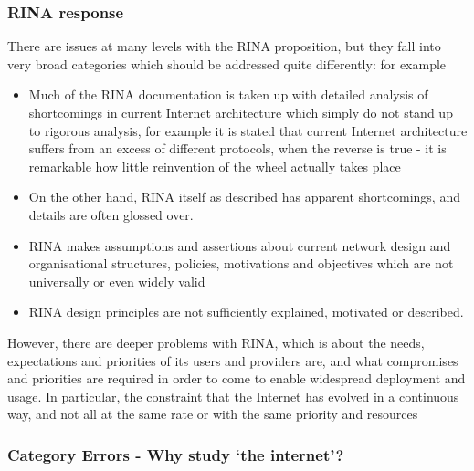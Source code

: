 \subsubsection{RINA response}

There are issues at many levels with the RINA proposition, but they fall into very broad categories which should be addressed quite differently: for example

\begin{itemize}
	\item Much of the RINA documentation is taken up with detailed analysis of shortcomings in current Internet architecture which simply do not stand up to rigorous analysis, for example it is stated that current Internet architecture suffers from an excess of different protocols, when the reverse is true - it is remarkable how little reinvention of the wheel actually takes place
	\item On the other hand, RINA itself as described has apparent shortcomings, and details are often glossed over.
	\item RINA makes assumptions and assertions about
	      current network design and organisational structures, policies, motivations and objectives which are not universally or even widely valid
	\item RINA design principles are not sufficiently explained, motivated or described.
\end{itemize}

However, there are deeper problems with RINA, which is about the needs, expectations and priorities of its users and providers are, and what compromises and priorities are required in order to come to enable widespread deployment and usage.
In particular, the constraint that the Internet has evolved in a continuous way, and not all at the same rate or with the same priority and resources

\subsubsection{Category Errors - Why study ‘the internet’?}

